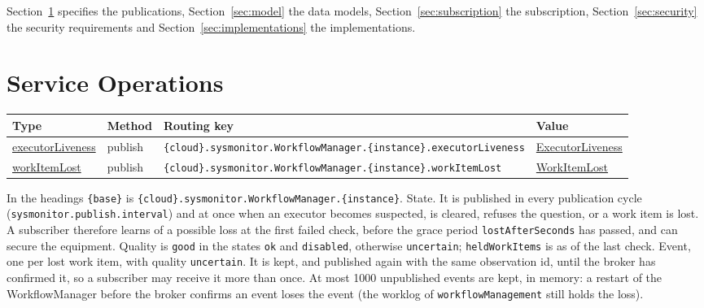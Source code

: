 \documentclass[a4paper]{arrowhead}
\newcommand{\mref}[1]{{\textcolor{ArrowheadPurple}{\hyperref[sec:model:#1]{#1}}}}
\newcommand{\oref}[1]{{\textcolor{ArrowheadBlue}{\hyperref[sec:operations:#1]{#1}}}}
\begin{document}
Section~\ref{sec:operations} specifies the publications, Section~\ref{sec:model} the data models,
Section~\ref{sec:subscription} the subscription, Section~\ref{sec:security} the security requirements and
Section~\ref{sec:implementations} the implementations.

\newpage
\section{Service Operations}
\label{sec:operations}

{\small
\begin{longtable}{|p{3.2cm}|p{1.5cm}|p{7.6cm}|p{3.5cm}|}

\hline
\rowcolor{gray!33} Type & Method & Routing key & Value \\ \hline
\endhead
\oref{executorLiveness} & publish & \texttt{\{cloud\}.sysmonitor.\allowbreak{}WorkflowManager.\allowbreak{}\{instance\}.\allowbreak{}executorLiveness} & \mref{ExecutorLiveness} \\ \hline
\oref{workItemLost} & publish & \texttt{\{cloud\}.sysmonitor.\allowbreak{}WorkflowManager.\allowbreak{}\{instance\}.\allowbreak{}workItemLost} & \mref{WorkItemLost} \\ \hline
\end{longtable}
}

In the headings \texttt{\{base\}} is \texttt{\{cloud\}.sysmonitor.WorkflowManager.\{instance\}}.
State. It is published in every publication cycle (\texttt{sysmonitor.\allowbreak{}publish.\allowbreak{}interval}) and at once when an
executor becomes suspected, is cleared, refuses the question, or a work item is lost. A subscriber therefore learns of a
possible loss at the first failed check, before the grace period \texttt{lost\allowbreak{}After\allowbreak{}Seconds} has passed, and can secure the
equipment. Quality is \texttt{good} in the states \texttt{ok} and \texttt{disabled}, otherwise \texttt{uncertain};
\texttt{heldWorkItems} is as of the last check.
Event, one per lost work item, with quality \texttt{uncertain}. It is kept, and published again with the same
observation id, until the broker has confirmed it, so a subscriber may receive it more than once. At most 1000
unpublished events are kept, in memory: a restart of the WorkflowManager before the broker confirms an event loses the
event (the worklog of \texttt{workflow\allowbreak{}Management} still holds the loss).
\end{document}
